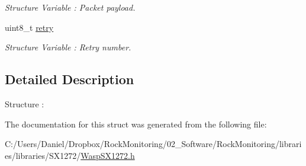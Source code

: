 \begin{DoxyCompactItemize}
\begin{DoxyCompactList}\small\item\em Structure Variable \+: Packet payload. \end{DoxyCompactList}\item 
uint8\+\_\+t \hyperlink{structpack_aed82d185b6c884f043d89594bdcb5dd4}{retry}\hypertarget{structpack_aed82d185b6c884f043d89594bdcb5dd4}{}\label{structpack_aed82d185b6c884f043d89594bdcb5dd4}

\begin{DoxyCompactList}\small\item\em Structure Variable \+: Retry number. \end{DoxyCompactList}\end{DoxyCompactItemize}


\subsection{Detailed Description}
Structure \+: 

The documentation for this struct was generated from the following file\+:\begin{DoxyCompactItemize}
\item 
C\+:/\+Users/\+Daniel/\+Dropbox/\+Rock\+Monitoring/02\+\_\+\+Software/\+Rock\+Monitoring/libraries/libraries/\+S\+X1272/\hyperlink{_wasp_s_x1272_8h}{Wasp\+S\+X1272.\+h}\end{DoxyCompactItemize}
